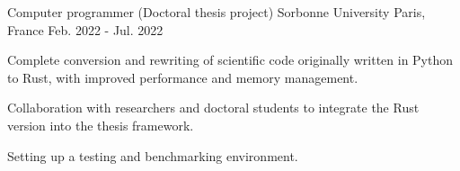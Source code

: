 \begin{cventries}
  \cventry
    {Computer programmer (Doctoral thesis project)} %
    {Sorbonne University} %
    {Paris, France} %
    {Feb. 2022 - Jul. 2022} %
    {
      \begin{cvitems} %
        \item {Complete conversion and rewriting of scientific code originally written in Python to Rust, with improved performance and memory management.}
        \item {Collaboration with researchers and doctoral students to integrate the Rust version into the thesis framework.}
        \item {Setting up a testing and benchmarking environment.}
      \end{cvitems}
    }


\end{cventries}
